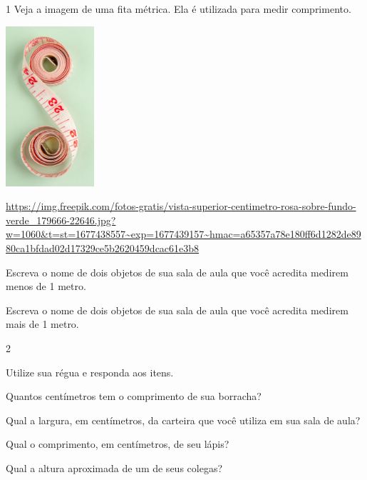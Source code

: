 \begin{escolha}

\num{1} Veja a imagem de uma fita métrica. Ela é utilizada para medir comprimento.

\includegraphics[width=1.29167in,height=2.33463in]{media/image41.png}

\url{https://img.freepik.com/fotos-gratis/vista-superior-centimetro-rosa-sobre-fundo-verde_179666-22646.jpg?w=1060\&t=st=1677438557~exp=1677439157~hmac=a65357a78e180ff6d1282de8980ca1bfdad02d17329ce5b2620459dcac61e3b8}

\begin{escolha}

\item
  Escreva o nome de dois objetos de sua sala de aula que você acredita
  medirem menos de 1 metro.

\item
  Escreva o nome de dois objetos de sua sala de aula que você acredita
  medirem mais de 1 metro.

\end{escolha}

\num{2}

Utilize sua régua e responda aos itens.

\begin{escolha}

\item
  Quantos centímetros tem o comprimento de sua borracha?

\item
  Qual a largura, em centímetros, da carteira que você utiliza em sua
  sala de aula?

\item
  Qual o comprimento, em centímetros, de seu lápis?

\item
  Qual a altura aproximada de um de seus colegas?


\end{escolha}
\end{escolha}
